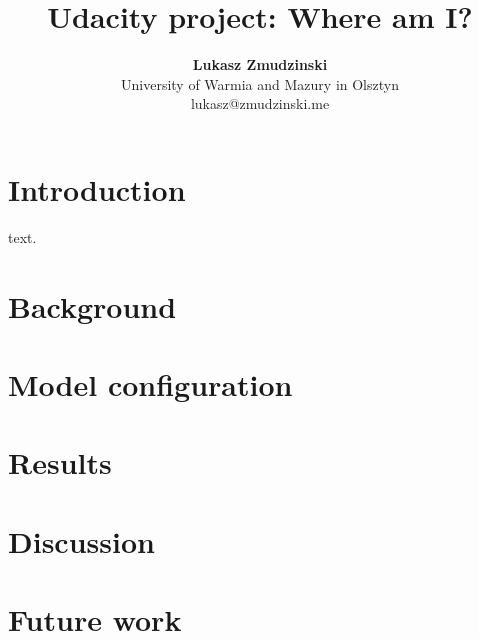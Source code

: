 \documentclass[10pt,journal,compsoc]{IEEEtran}
\begin{document}
    
    \title{Udacity project: Where am I?}
    
    \author{\textbf{Lukasz Zmudzinski} \\ University of Warmia and Mazury in Olsztyn \\ lukasz@zmudzinski.me}
    
    
    
    \maketitle
    \IEEEdisplaynontitleabstractindextext
    \IEEEpeerreviewmaketitle
    \section{Introduction}
    \label{sec:introduction}
    
     text. 

    \section{Background}

    \section{Model configuration}

    \section{Results}

    \section{Discussion}

    \section{Future work}
    
   
   
\end{document}
